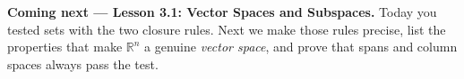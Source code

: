 \documentclass[10pt]{article}
\begin{document}
\begin{spiralbox}
\textbf{Coming next --- Lesson 3.1: Vector Spaces and Subspaces.} Today you tested sets with the
two closure rules. Next we make those rules precise, list the properties that make $\mathbb{R}^n$
a genuine \emph{vector space}, and prove that spans and column spaces always pass the test.
\end{spiralbox}
\end{document}
